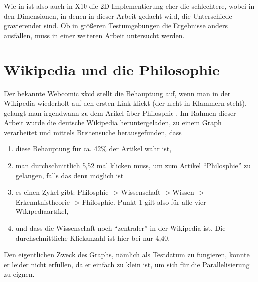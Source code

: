 Wie in \cite{Buluc:2011} ist also auch in X10 die 2D Implementierung eher die schlechtere, wobei in den Dimensionen, in denen in dieser Arbeit gedacht wird, die Unterschiede gravierender sind. Ob in größeren Testumgebungen die Ergebnisse anders ausfallen, muss in einer weiteren Arbeit untersucht werden.

\section{Wikipedia und die Philosophie} %
\label{sec:wikipedia_und_die_philosophie}
Der bekannte Webcomic xkcd stellt die Behauptung auf, wenn man in der Wikipedia wiederholt auf den ersten Link klickt (der nicht in Klammern steht), gelangt man irgendwann zu dem Arikel über Philosphie \cite{xkcd:Online}. Im Rahmen dieser Arbeit wurde die deutsche Wikipedia heruntergeladen, zu einem Graph verarbeitet und mittels Breitensuche herausgefunden, dass
\begin{enumerate}
	\item diese Behauptung für ca. 42\% der Artikel wahr ist,
	\item man durchschnittlich 5,52 mal klicken muss, um zum Artikel \enquote{Philosphie} zu gelangen, falls das denn möglich ist
	\item es einen Zykel gibt: Philosphie -> Wissenschaft -> Wissen -> Erkenntnistheorie -> Philosphie. Punkt 1 gilt also für alle vier Wikipediaartikel,
	\item und dass die Wissenschaft noch \enquote{zentraler} in der Wikipedia ist. Die durchschnittliche Klickanzahl ist hier bei nur 4,40.
\end{enumerate}
Den eigentlichen Zweck des Graphs, nämlich als Testdatum zu fungieren, konnte er leider nicht erfüllen, da er einfach zu klein ist, um sich für die Parallelisierung zu eignen.
